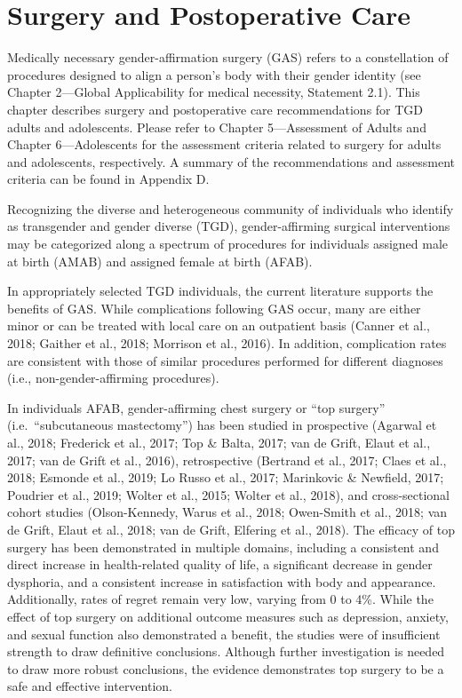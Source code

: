 \documentclass[
]{book}
\begin{document}
\hypertarget{surgery-and-postoperative-care}{%
\chapter{Surgery and Postoperative Care}\label{surgery-and-postoperative-care}}

Medically necessary gender-affirmation surgery
(GAS) refers to a constellation of procedures
designed to align a person's body with their gender
identity (see Chapter 2---Global Applicability for
medical necessity, Statement 2.1). This chapter
describes surgery and postoperative care recommendations for TGD adults and adolescents. Please
refer to Chapter 5---Assessment of Adults and
Chapter 6---Adolescents for the assessment criteria
related to surgery for adults and adolescents,
respectively. A summary of the recommendations
and assessment criteria can be found in Appendix D.

Recognizing the diverse and heterogeneous community of individuals who identify as transgender
and gender diverse (TGD), gender-affirming surgical
interventions may be categorized along a spectrum
of procedures for individuals assigned male at birth
(AMAB) and assigned female at birth (AFAB).

In appropriately selected TGD individuals, the
current literature supports the benefits of GAS.
While complications following GAS occur, many
are either minor or can be treated with local care
on an outpatient basis (Canner et al., 2018;
Gaither et al., 2018; Morrison et al., 2016). In
addition, complication rates are consistent with
those of similar procedures performed for different diagnoses (i.e., non-gender-affirming
procedures).

In individuals AFAB, gender-affirming chest
surgery or ``top surgery'' (i.e.~``subcutaneous mastectomy'') has been studied in prospective
(Agarwal et al., 2018; Frederick et al., 2017; Top
\& Balta, 2017; van de Grift, Elaut et al., 2017;
van de Grift et al., 2016), retrospective (Bertrand
et al., 2017; Claes et al., 2018; Esmonde et al.,
2019; Lo Russo et al., 2017; Marinkovic \&
Newfield, 2017; Poudrier et al., 2019; Wolter
et al., 2015; Wolter et al., 2018), and cross-sectional
cohort studies (Olson-Kennedy, Warus et al.,
2018; Owen-Smith et al., 2018; van de Grift, Elaut
et al., 2018; van de Grift, Elfering et al., 2018).
The efficacy of top surgery has been demonstrated in multiple domains, including a consistent and direct increase in health-related quality
of life, a significant decrease in gender dysphoria,
and a consistent increase in satisfaction with
body and appearance. Additionally, rates of regret
remain very low, varying from 0 to 4\%. While
the effect of top surgery on additional outcome
measures such as depression, anxiety, and sexual
function also demonstrated a benefit, the studies
were of insufficient strength to draw definitive
conclusions. Although further investigation is
needed to draw more robust conclusions, the evidence demonstrates top surgery to be a safe and
effective intervention.
\end{document}
